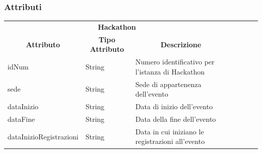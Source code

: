 \documentclass[a4paper, 15pt, oneside]{article}
\begin{document}
	\subsubsection{Attributi}
		\begin{table}[H]
			\begin{tabular}{lllllll}
				\cline{1-3}
				\multicolumn{3}{|c|}{\textbf{Hackathon}}                                                                                                                                                                                                                        &  &  &  &  \\ \cline{1-3}
				\multicolumn{1}{|c|}{\textbf{Attributo}}      & \multicolumn{1}{c|}{\textbf{Tipo Attributo}}                   & \multicolumn{1}{c|}{\textbf{Descrizione}}                                                                                                      &  &  &  &  \\ \cline{1-3}
				\multicolumn{1}{|l|}{idNum}                   & \multicolumn{1}{l|}{String}                                    & \multicolumn{1}{l|}{Numero identificativo per l'istanza di Hackathon}                                                                          &  &  &  &  \\ \cline{1-3}
				\multicolumn{1}{|l|}{sede}                    & \multicolumn{1}{l|}{String}                                    & \multicolumn{1}{l|}{Sede di appartenenza dell'evento}                                                                                          &  &  &  &  \\ \cline{1-3}
				\multicolumn{1}{|l|}{dataInizio}              & \multicolumn{1}{l|}{String}                                    & \multicolumn{1}{l|}{Data di inizio dell'evento}                                                                                                &  &  &  &  \\ \cline{1-3}
				\multicolumn{1}{|l|}{dataFine}                & \multicolumn{1}{l|}{String}                                    & \multicolumn{1}{l|}{Data della fine dell'evento}                                                                                               &  &  &  &  \\ \cline{1-3}
				\multicolumn{1}{|l|}{dataInizioRegistrazioni} & \multicolumn{1}{l|}{String}                                    & \multicolumn{1}{l|}{Data in cui iniziano le registrazioni all'evento}                                                                          &  &  &  &  \\ \cline{1-3}

\end{tabular}
\end{table}
\end{document}
